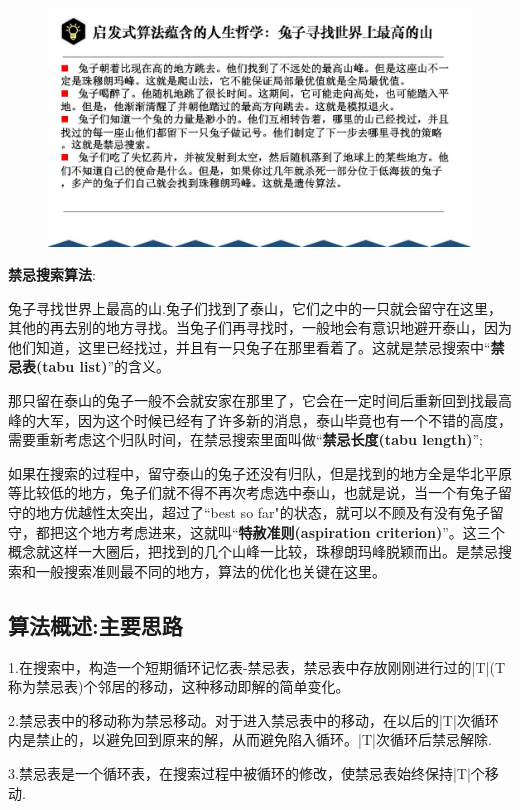 \documentclass[11pt,a4paper,oneside]{book}
\begin{document}
\begin{figure}[H]
	\centering
	\includegraphics[width=\textwidth]{11.jpg}
\end{figure}

\textbf{禁忌搜索算法}:

兔子寻找世界上最高的山.兔子们找到了泰山，它们之中的一只就会留守在这里，其他的再去别的地方寻找。当兔子们再寻找时，一般地会有意识地避开泰山，因为他们知道，这里已经找过，并且有一只兔子在那里看着了。这就是禁忌搜索中“\textbf{禁忌表(tabu list)}”的含义。

那只留在泰山的兔子一般不会就安家在那里了，它会在一定时间后重新回到找最高峰的大军，因为这个时候已经有了许多新的消息，泰山毕竟也有一个不错的高度，需要重新考虑这个归队时间，在禁忌搜索里面叫做“\textbf{禁忌长度(tabu length)}”;

如果在搜索的过程中，留守泰山的兔子还没有归队，但是找到的地方全是华北平原等比较低的地方，兔子们就不得不再次考虑选中泰山，也就是说，当一个有兔子留守的地方优越性太突出，超过了“best so far"的状态，就可以不顾及有没有兔子留守，都把这个地方考虑进来，这就叫“\textbf{特赦准则(aspiration criterion)}”。这三个概念就这样一大圈后，把找到的几个山峰一比较，珠穆朗玛峰脱颖而出。是禁忌搜索和一般搜索准则最不同的地方，算法的优化也关键在这里。

\subsection{算法概述:主要思路}
1.在搜索中，构造一个短期循环记忆表-禁忌表，禁忌表中存放刚刚进行过的|T|(T称为禁忌表)个邻居的移动，这种移动即解的简单变化。

2.禁忌表中的移动称为禁忌移动。对于进入禁忌表中的移动，在以后的|T|次循环内是禁止的，以避免回到原来的解，从而避免陷入循环。|T|次循环后禁忌解除.

3.禁忌表是一个循环表，在搜索过程中被循环的修改，使禁忌表始终保持|T|个移动.
\end{document}
